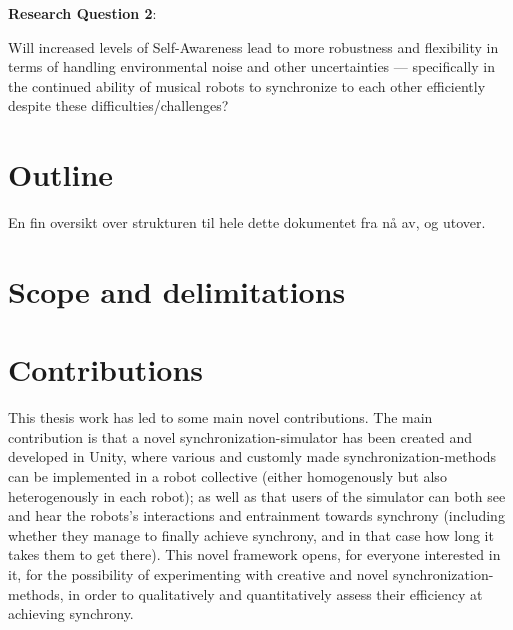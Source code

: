 	\textbf{Research Question 2}:
	
	Will increased levels of Self-Awareness lead to more robustness and flexibility in terms of handling environmental noise and other uncertainties — specifically in the continued ability of musical robots to synchronize to each other efficiently despite these difficulties/challenges? \nl
	
	
	
	
	
	
	
	\section{Outline}
	En fin  oversikt over strukturen til hele dette dokumentet fra nå av, og utover.


	\section{Scope and delimitations}

	\section{Contributions}
	This thesis work has led to some main novel contributions. The main contribution is that a novel synchronization-simulator has been created and developed in Unity, where various and customly made synchronization-methods can be implemented in a robot collective (either homogenously but also heterogenously in each robot); as well as that users of the simulator can both see and hear the robots's interactions and entrainment towards synchrony (including whether they manage to finally achieve synchrony, and in that case how long it takes them to get there). This novel framework opens, for everyone interested in it, for the possibility of experimenting with creative and novel synchronization-methods, in order to qualitatively and quantitatively assess their efficiency at achieving synchrony.
